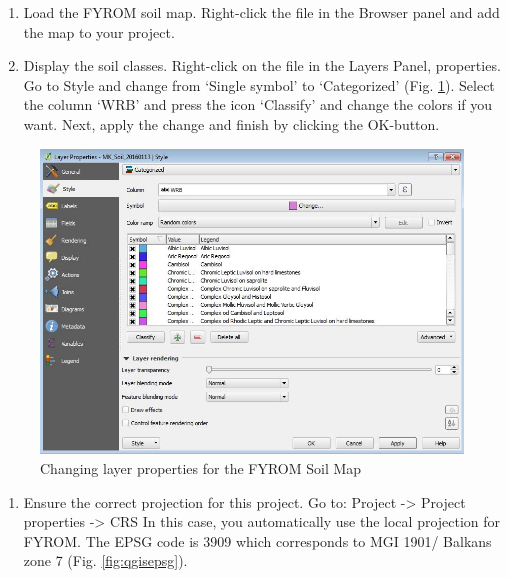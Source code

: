 \documentclass[10pt,b5paper,]{book}
\providecommand{\tightlist}{%
  \setlength{\itemsep}{0pt}\setlength{\parskip}{0pt}}
\theoremstyle{definition}
\theoremstyle{definition}
\theoremstyle{definition}
\theoremstyle{remark}
\begin{document}
\begin{enumerate}
\def\labelenumi{\arabic{enumi}.}
\setcounter{enumi}{3}
\tightlist
\item
  Load the FYROM soil map. Right-click the file in the Browser panel and
  add the map to your project.
\item
  Display the soil classes. Right-click on the file in the Layers Panel,
  properties. Go to Style and change from `Single symbol' to
  `Categorized' (Fig. \ref{fig:layerprop}). Select the column `WRB' and
  press the icon `Classify' and change the colors if you want. Next,
  apply the change and finish by clicking the OK-button.
\end{enumerate}

\begin{figure}

{\centering \includegraphics[width=0.8\linewidth]{images/Conv_upscaling2} 

}

\caption{Changing layer properties for the FYROM Soil Map}\label{fig:layerprop}
\end{figure}

\begin{enumerate}
\def\labelenumi{\arabic{enumi}.}
\setcounter{enumi}{5}
\tightlist
\item
  Ensure the correct projection for this project. Go to: Project
  -\textgreater{} Project properties -\textgreater{} CRS In this case,
  you automatically use the local projection for FYROM. The EPSG code is
  3909 which corresponds to MGI 1901/ Balkans zone 7 (Fig.
  \ref{fig:qgisepsg}).
\end{enumerate}
\end{document}
